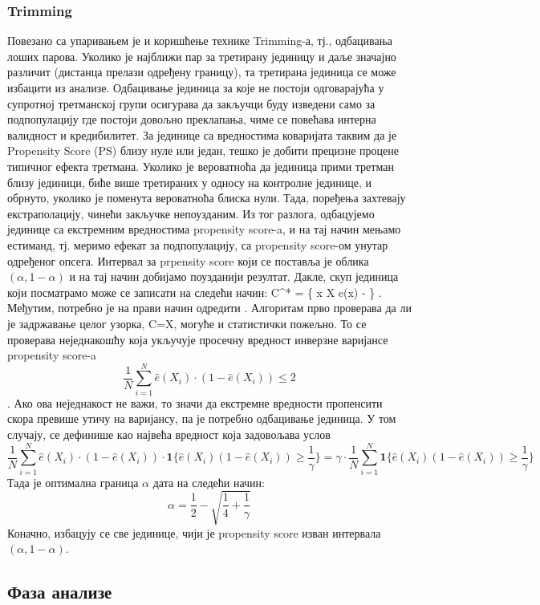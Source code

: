 \documentclass[12pt, a4paper]{article}
\begin{document}
\subsubsection{Trimming}
Повезано са упаривањем је и коришћење технике Trimming-а, тј., одбацивања лоших парова. Уколико је најближи пар за третирану јединицу и даље значајно различит (дистанца прелази одређену границу), та третирана јединица се може избацити из анализе. Одбацивање јединица за које не постоји одговарајућа у супротној третманској групи осигурава да закључци буду изведени само за подпопулацију где постоји довољно преклапања, чиме се повећава интерна валидност и кредибилитет. 
За јединице са вредностима коваријата таквим да је Propensity Score (PS) близу нуле или један, тешко је добити прецизне процене типичног ефекта третмана. Уколико је вероватноћа да јединица прими третман близу јединици, биће више третираних у односу на контролне јединице, и обрнуто, уколико је поменута вероватноћа блиска нули. Тада, поређења захтевају екстраполацију, чинећи закључке непоузданим. Из тог разлога, одбацујемо јединице са екстремним вредностима propensity score-a, и на тај начин мењамо естиманд, тј. меримо ефекат за подпопулацију, са propensity score-ом унутар одређеног опсега. Интервал за prpensity score који се поставља је облика $(\alpha, 1-\alpha)$ и на тај начин добијамо поузданији резултат. Дакле, скуп јединица који посматрамо може се записати на следећи начин:  C^* = \{ x \in X \mid \alpha \le e(x)  - \alpha \} \quad. 
Међутим, потребно је на прави начин одредити \alpha.  Алгоритам прво проверава да ли је  задржавање целог узорка, C=X, могуће и статистички пожељно. То се проверава неједнакошћу која укључује просечну вредност инверзне варијансе propensity score-a $$\frac{1}{N} \sum_{i=1}^{N} \hat{e}(X_i) \cdot (1 - \hat{e}(X_i)) \le 2$$.
Ако ова неједнакост не важи, то значи да екстремне вредности пропенсити скора превише утичу на варијансу, па је потребно одбацивање јединица. У том случају, \gamma се дефинише као највећа вредност која задовољава услов
 $$
\frac{1}{N} \sum_{i=1}^{N} \hat{e}(X_i) \cdot (1 - \hat{e}(X_i)) \cdot 
\mathbf{1}\{ \hat{e}(X_i)(1 - \hat{e}(X_i)) \ge \frac{1}{\gamma} \}
= 
\gamma \cdot \frac{1}{N} \sum_{i=1}^{N} 
\mathbf{1}\{ \hat{e}(X_i)(1 - \hat{e}(X_i)) \ge \frac{1}{\gamma} \}
$$
Тада је оптимална граница $\alpha$ дата на следећи начин:
$$\alpha = \frac{1}{2} - \sqrt{\frac{1}{4} + \frac{1}{\gamma}}$$
Коначно, избацују се све јединице, чији је propensity score изван интервала  $(\alpha, 1-\alpha)$.


\subsection{Фаза анализе}
\end{document}
